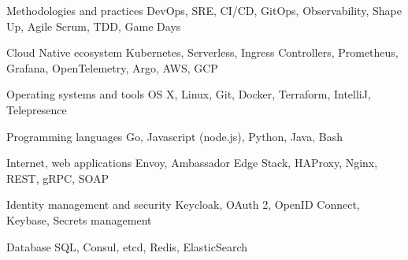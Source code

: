 
\begin{cvskills}

  \cvskill
    {Methodologies and practices} %
    {DevOps, SRE, CI/CD, GitOps, Observability, Shape Up, Agile Scrum, TDD, Game Days} %

  \cvskill
    {Cloud Native ecosystem} %
    {Kubernetes, Serverless, Ingress Controllers, Prometheus, Grafana, OpenTelemetry, Argo, AWS, GCP} %

  \cvskill
    {Operating systems and tools} %
    {OS X, Linux, Git, Docker, Terraform, IntelliJ, Telepresence} %

  \cvskill
    {Programming languages} %
    {Go, Javascript (node.js), Python, Java, Bash} %

  \cvskill
    {Internet, web applications} %
    {Envoy, Ambassador Edge Stack, HAProxy, Nginx, REST, gRPC, SOAP} %

  \cvskill
    {Identity management and security} %
    {Keycloak, OAuth 2, OpenID Connect, Keybase, Secrets management} %

  \cvskill
    {Database} %
    {SQL, Consul, etcd, Redis, ElasticSearch} %

\end{cvskills}